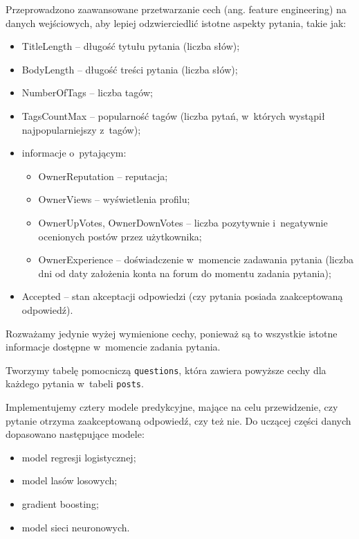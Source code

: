 \documentclass[12pt]{article}
\begin{document}
	\vspace{0.25cm}
	
	Przeprowadzono zaawansowane przetwarzanie cech (ang. feature engineering) na danych wejściowych, aby lepiej odzwierciedlić istotne aspekty pytania, takie jak:
	\begin{itemize}
		\item TitleLength -- długość tytułu pytania (liczba słów);
		\item BodyLength -- długość treści pytania (liczba słów);
		\item NumberOfTags -- liczba tagów;
		\item TagsCountMax -- popularność tagów (liczba pytań, w~których wystąpił najpopularniejszy z~tagów);
		\item informacje o~pytającym:
		\begin{itemize}
			\item OwnerReputation -- reputacja;
			\item OwnerViews -- wyświetlenia profilu;
			\item OwnerUpVotes, OwnerDownVotes -- liczba pozytywnie i~negatywnie ocenionych postów przez użytkownika;
			\item OwnerExperience -- doświadczenie w~momencie zadawania pytania (liczba dni od daty założenia konta na forum do momentu zadania pytania);
		\end{itemize}
		\item Accepted -- stan akceptacji odpowiedzi (czy pytania posiada zaakceptowaną odpowiedź).
	\end{itemize}
	Rozważamy jedynie wyżej wymienione cechy, ponieważ są to wszystkie istotne informacje dostępne w~momencie zadania pytania.
	
	\vspace{0.25cm}
	
	Tworzymy tabelę pomocniczą \verb|questions|, która zawiera powyższe cechy dla każdego pytania w~tabeli \verb|posts|.
	
	\vspace{0.25cm}
	
	Implementujemy cztery modele predykcyjne, mające na celu przewidzenie, czy pytanie otrzyma zaakceptowaną odpowiedź, czy też nie. Do uczącej części danych dopasowano następujące modele:
	\begin{itemize}
		\item model regresji logistycznej;
		\item model lasów losowych;
		\item gradient boosting;
		\item model sieci neuronowych.
	\end{itemize}
	
\end{document}
